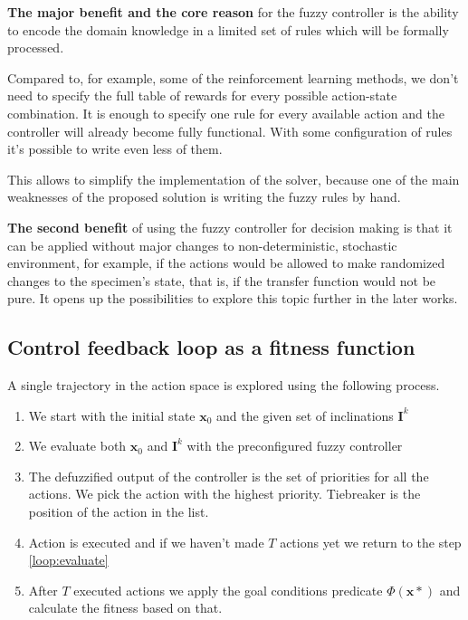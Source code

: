 \documentclass[11pt, a4paper]{article}
\begin{document}
	\textbf{The major benefit and the core reason} for the fuzzy controller is the ability to encode the domain knowledge in a limited set of rules which will be formally processed.

	Compared to, for example, some of the reinforcement learning methods, we don't need to specify the full table of rewards for every possible action-state combination.
	It is enough to specify one rule for every available action and the controller will already become fully functional.
	With some configuration of rules it's possible to write even less of them.

	This allows to simplify the implementation of the solver, because one of the main weaknesses of the proposed solution is writing the fuzzy rules by hand.

  \textbf{The second benefit} of using the fuzzy controller for decision making is that it can be applied without major changes to non-deterministic, stochastic environment,
  for example, if the actions would be allowed to make randomized changes to the specimen's state, that is, if the transfer function would not be pure.
  It opens up the possibilities to explore this topic further in the later works.

	\subsection{Control feedback loop as a fitness function}\label{fitness}

	A single trajectory in the action space is explored using the following process.

	\begin{enumerate}
		\item We start with the initial state $\mathbf{x}_0$ and the given set of inclinations $\mathbf{I}^k$
		\item\label{loop:evaluate} We evaluate both $\mathbf{x}_0$ and $\mathbf{I}^k$ with the preconfigured fuzzy controller
		\item The defuzzified output of the controller is the set of priorities for all the  actions. We pick the action with the highest priority. Tiebreaker is the position of the action in the list.
		\item Action is executed and if we haven't made $T$ actions yet we return to the step \ref{loop:evaluate}
		\item After $T$ executed actions we apply the goal conditions predicate $\Phi(\mathbf{x}*)$ and calculate the fitness based on that.
	\end{enumerate}
\end{document}
